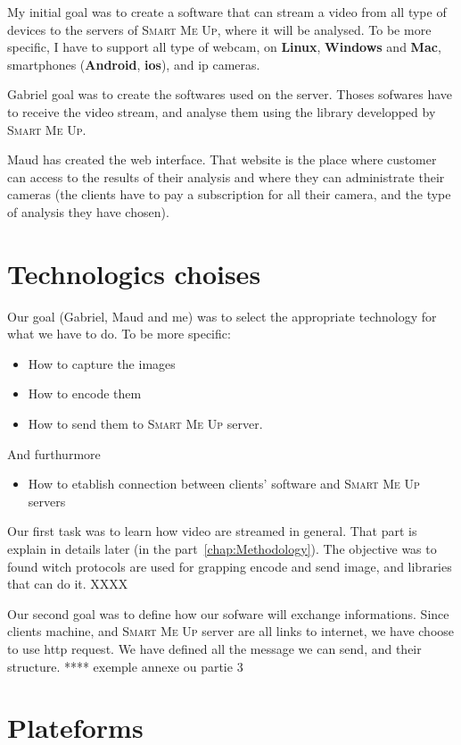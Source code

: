 \documentclass[a4paper,11pt]{custom}
\newcommand{\smu}{\textsc{Smart Me Up}}
\newcommand{\linux}{\textbf{Linux}}
\newcommand{\win}{\textbf{Windows}}
\newcommand{\mac}{\textbf{Mac}}
\newcommand{\android}{\textbf{Android}}
\newcommand{\ios}{\textbf{ios}}
\begin{document}
My initial goal was to create a software that can stream a video from all type of
devices to the servers of \smu, where it will be analysed. To be more specific,
I have to support all type of webcam, on \linux, \win{} and \mac, smartphones
(\android, \ios), and ip cameras.

Gabriel goal was to create the softwares used on the server. Thoses sofwares
have to receive the video stream, and analyse them using the library developped
by \smu.

Maud has created the web interface. That website is the place where customer can
access to the results of their analysis and where they can administrate their
cameras (the clients have to pay a subscription for all their camera, and the
type of analysis they have chosen).

\section{Technologics choises}

Our goal (Gabriel, Maud and me) was to select the appropriate technology for
what we have to do. To be more specific:
\begin{itemize}
\item How to capture the images
\item How to encode them
\item How to send them to \smu{} server.
\end{itemize}

And furthurmore
\begin{itemize}
\item How to etablish connection between clients' software and \smu{} servers
\end{itemize}

Our first task was to learn how video are streamed in general. That part is
explain in details later (in the part~\ref{chap:Methodology}). The objective
was to found witch protocols are used for grapping encode and send image, and
libraries that can do it. XXXX

Our second goal was to define how our sofware will exchange informations. Since
clients machine, and \smu{} server are all links to internet, we have choose to
use http request. We have defined all the message we can send, and their
structure. **** exemple annexe ou partie 3

\section{Plateforms}
\end{document}
